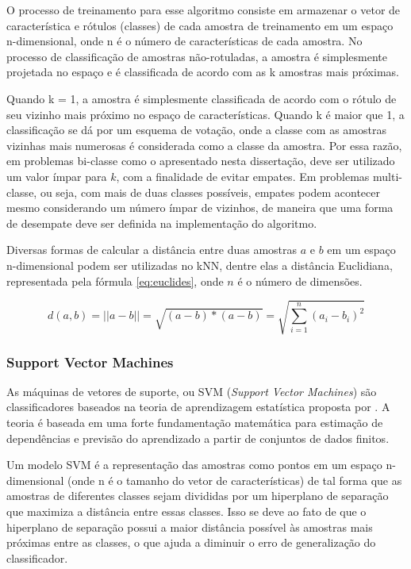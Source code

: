 O processo de treinamento para esse algoritmo consiste em armazenar o vetor de característica e rótulos (classes) de cada amostra de treinamento em um espaço n-dimensional, onde n é o número de características de cada amostra. No processo de classificação de amostras não-rotuladas, a amostra é simplesmente projetada no espaço e é classificada de acordo com as k amostras mais próximas.

Quando k = 1, a amostra é simplesmente classificada de acordo com o rótulo de seu vizinho mais próximo no espaço de características. Quando k é maior que 1, a classificação se dá por um esquema de votação, onde a classe com as amostras vizinhas mais numerosas é considerada como a classe da amostra. Por essa razão, em problemas bi-classe como o apresentado nesta dissertação, deve ser utilizado um valor ímpar para $k$, com a finalidade de evitar empates. Em problemas multi-classe, ou seja, com mais de duas classes possíveis, empates podem acontecer mesmo considerando um número ímpar de vizinhos, de maneira que uma forma de desempate deve ser definida na implementação do algoritmo.

Diversas formas de calcular a distância entre duas amostras $a$ e $b$ em um espaço n-dimensional podem ser utilizadas no kNN, dentre elas a distância Euclidiana, representada pela fórmula \ref{eq:euclides}, onde $n$ é o número de dimensões.

\begin{equation}
	\displaystyle d(a,b) = ||a - b|| = \sqrt{(a - b)*(a -b)} =
	\displaystyle \sqrt{\sum_{i=1}^{n}(a_i - b_i)^2}
\label{eq:euclides}
\end{equation}

\subsubsection*{Support Vector Machines}

As máquinas de vetores de suporte, ou SVM (\textit{Support Vector Machines}) são classificadores baseados na teoria de aprendizagem estatística proposta por \cite{vapnik:1995}. A teoria é baseada em uma forte fundamentação matemática para estimação de dependências e previsão do aprendizado a partir de conjuntos de dados finitos. 

Um modelo SVM é a representação das amostras como pontos em um espaço n-dimensional (onde n é o tamanho do vetor de características) de tal forma que as amostras de diferentes classes sejam divididas por um hiperplano de separação que maximiza a distância entre essas classes. Isso se deve ao fato de que o hiperplano de separação possui a maior distância possível às amostras mais próximas entre as classes, o que ajuda a diminuir o erro de generalização do classificador.

